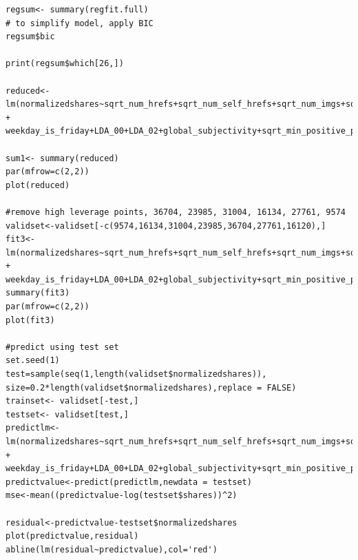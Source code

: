 \documentclass[letterpaper,12pt]{article}
\begin{document}
\begin{lstlisting}
regsum<- summary(regfit.full)
# to simplify model, apply BIC
regsum$bic

print(regsum$which[26,])

reduced<-lm(normalizedshares~sqrt_num_hrefs+sqrt_num_self_hrefs+sqrt_num_imgs+sqrt_num_videos+average_token_length+num_keywords+data_channel_is_entertainment+data_channel_is_socmed+kw_min_min+sqrt_kw_max_min+sqrt_kw_min_max+sqrt_kw_max_max+kw_avg_max+kw_min_avg+sqrt_kw_max_max+kw_avg_max+kw_min_avg+weekday_is_monday+weekday_is_tuesday+weekday_is_wednesday+weekday_is_thursday + weekday_is_friday+LDA_00+LDA_02+global_subjectivity+sqrt_min_positive_polarity+title_subjectivity+title_sentiment_polarity+abs_title_subjectivity)

sum1<- summary(reduced)
par(mfrow=c(2,2))
plot(reduced)

#remove high leverage points, 36704, 23985, 31004, 16134, 27761, 9574
validset<-validset[-c(9574,16134,31004,23985,36704,27761,16120),]
fit3<-lm(normalizedshares~sqrt_num_hrefs+sqrt_num_self_hrefs+sqrt_num_imgs+sqrt_num_videos+average_token_length+num_keywords+data_channel_is_entertainment+data_channel_is_socmed+kw_min_min+sqrt_kw_max_min+sqrt_kw_min_max+sqrt_kw_max_max+kw_avg_max+kw_min_avg+sqrt_kw_max_max+kw_avg_max+kw_min_avg+weekday_is_monday+weekday_is_tuesday+weekday_is_wednesday+weekday_is_thursday + weekday_is_friday+LDA_00+LDA_02+global_subjectivity+sqrt_min_positive_polarity+title_subjectivity+title_sentiment_polarity+abs_title_subjectivity,data=validset)
summary(fit3)
par(mfrow=c(2,2))
plot(fit3)

#predict using test set
set.seed(1)
test=sample(seq(1,length(validset$normalizedshares)), size=0.2*length(validset$normalizedshares),replace = FALSE)
trainset<- validset[-test,]
testset<- validset[test,]
predictlm<-lm(normalizedshares~sqrt_num_hrefs+sqrt_num_self_hrefs+sqrt_num_imgs+sqrt_num_videos+average_token_length+num_keywords+data_channel_is_entertainment+data_channel_is_socmed+kw_min_min+sqrt_kw_max_min+sqrt_kw_min_max+sqrt_kw_max_max+kw_avg_max+kw_min_avg+sqrt_kw_max_max+kw_avg_max+kw_min_avg+weekday_is_monday+weekday_is_tuesday+weekday_is_wednesday+weekday_is_thursday + weekday_is_friday+LDA_00+LDA_02+global_subjectivity+sqrt_min_positive_polarity+title_subjectivity+title_sentiment_polarity+abs_title_subjectivity,data=trainset)
predictvalue<-predict(predictlm,newdata = testset)
mse<-mean((predictvalue-log(testset$shares))^2)

residual<-predictvalue-testset$normalizedshares
plot(predictvalue,residual)
abline(lm(residual~predictvalue),col='red')



\end{lstlisting}
\end{document}
